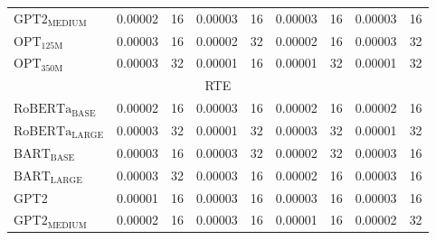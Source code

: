 {\begin{table*}[#1]
{\begin{tabular}{
    l@{\hskip 0.1in}
    c
    c@{\hskip 0.4in}
    c
    c@{\hskip 0.4in}
    c
    c@{\hskip 0.4in}
    c
    c
}
$\text{GPT2}_\text{MEDIUM}$ & 
0.00002&16 & 0.00003&16 & 0.00003&16 & 0.00003&16 \\

$\text{OPT}_\text{125M}$ & 
0.00003&16 & 0.00002&32 & 0.00002&16 & 0.00003&32 \\

$\text{OPT}_\text{350M}$ & 
0.00003&32 & 0.00001&16 & 0.00001&32 & 0.00001&32 \\ 


\midrule
\multicolumn{9}{c}{RTE} \\
\midrule

$\text{RoBERTa}_\text{BASE}$ & 
0.00002 & %
16 & %


0.00003 & %
16 & %


0.00002 & %
16 & %


0.00002 & %
16 %


\\ 

$\text{RoBERTa}_\text{LARGE}$ & 
0.00003 & %
32 & %


0.00001 & %
32 & %


0.00003 & %
32 & %


0.00001 & %
32 %


\\ 

$\text{BART}_\text{BASE}$ & 
0.00003 & %
16 & %


0.00003 & %
32 & %


0.00002 & %
32 & %


0.00003 & %
16 %


\\ 

$\text{BART}_\text{LARGE}$ & 
0.00003 & %
32 & %


0.00003 & %
16 & %


0.00002 & %
16 & %


0.00003 & %
16 %


\\ 

GPT2 & 
0.00001&16 & 0.00003&16 & 0.00003&16 & 0.00003&16 \\

$\text{GPT2}_\text{MEDIUM}$ & 
0.00002&16 & 0.00003&16 & 0.00001&16 & 0.00002&32 \\


\end{tabular}}
\end{table*}}
